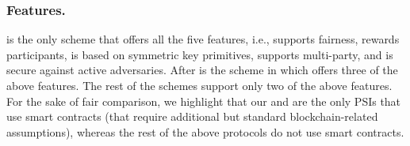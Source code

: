 \vspace{-3mm}
\subsubsection{Features.} \epsi is the only scheme that offers all the five features, i.e., supports fairness, rewards participants, is based on symmetric key primitives, supports multi-party, and is secure against active adversaries. After \epsi is the scheme in \cite{NevoTY21} which offers three of the above features. The rest of the schemes support only two of the above features. For the sake of fair comparison, we highlight that our \epsi and  \fpsi are the only PSIs that use smart contracts (that require additional but standard blockchain-related assumptions), whereas the rest of the above protocols do not use smart contracts. 








